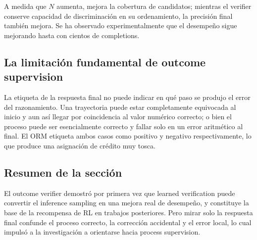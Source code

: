 A medida que $N$ aumenta, mejora la cobertura de candidatos; mientras el verifier conserve capacidad de discriminación en su ordenamiento, la precisión final también mejora. Se ha observado experimentalmente que el desempeño sigue mejorando hasta con cientos de completions.


\subsection{La limitación fundamental de outcome supervision}

La etiqueta de la respuesta final no puede indicar en qué paso se produjo el error del razonamiento. Una trayectoria puede estar completamente equivocada al inicio y aun así llegar por coincidencia al valor numérico correcto; o bien el proceso puede ser esencialmente correcto y fallar solo en un error aritmético al final. El ORM etiqueta ambos casos como positivo y negativo respectivamente, lo que produce una asignación de crédito muy tosca.

\subsection{Resumen de la sección}

El outcome verifier demostró por primera vez que learned verification puede convertir el inference sampling en una mejora real de desempeño, y constituye la base de la recompensa de RL en trabajos posteriores. Pero mirar solo la respuesta final confunde el proceso correcto, la corrección accidental y el error local, lo cual impulsó a la investigación a orientarse hacia process supervision.
